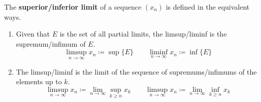   \begin{definition}
    The \textbf{superior/inferior limit} of a sequence $(x_n)$ is defined in the equivalent ways. 
    \begin{enumerate}
      \item Given that $E$ is the set of all partial limits, the limsup/liminf is the supremum/infimum of $E$. 
      \begin{equation}
        \limsup_{n \rightarrow \infty} x_n \coloneqq \sup\{E\} \qquad \liminf_{n \rightarrow \infty} x_n \coloneqq \inf\{E\}
      \end{equation}
      \item The limsup/liminf is the limit of the sequence of supremums/infimums of the elements up to $k$.  
      \begin{equation}
        \limsup_{n \rightarrow \infty} x_n \coloneqq \lim_{n \rightarrow \infty} \sup_{k \geq n} x_k \qquad \limsup_{n \rightarrow \infty} x_n \coloneqq \lim_{n \rightarrow \infty} \inf_{k \geq n} x_k 
      \end{equation}
    \end{enumerate}
  \end{definition}

